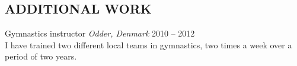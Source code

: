 \documentclass[margin, 10pt]{res} %
\begin{document}
\begin{resume}

\section{ADDITIONAL WORK}

Gymnastics instructor {\it Odder, Denmark} \hfill 2010 -- 2012 \\
I have trained two different local teams in gymnastics, two times a week over a period of two years.


\end{resume}
\end{document}
